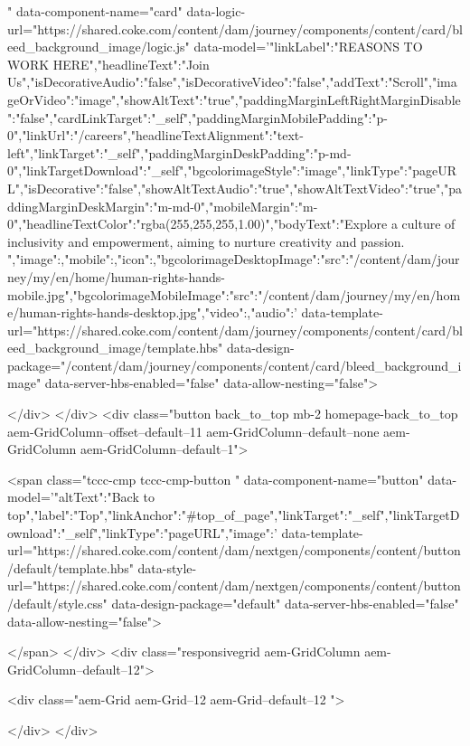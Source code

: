   " data-component-name="card" data-logic-url="https://shared.coke.com/content/dam/journey/components/content/card/bleed_background_image/logic.js" data-model='{"linkLabel":"REASONS TO WORK HERE","headlineText":"Join Us","isDecorativeAudio":"false","isDecorativeVideo":"false","addText":"Scroll","imageOrVideo":"image","showAltText":"true","paddingMarginLeftRightMarginDisable":"false","cardLinkTarget":"_self","paddingMarginMobilePadding":"p-0","linkUrl":"/careers","headlineTextAlignment":"text-left","linkTarget":"_self","paddingMarginDeskPadding":"p-md-0","linkTargetDownload":"_self","bgcolorimageStyle":"image","linkType":"pageURL","isDecorative":"false","showAltTextAudio":"true","showAltTextVideo":"true","paddingMarginDeskMargin":"m-md-0","mobileMargin":"m-0","headlineTextColor":"rgba(255,255,255,1.00)","bodyText":"Explore a culture of inclusivity and empowerment, aiming to nurture creativity and passion. ","image":{},"mobile":{},"icon":{},"bgcolorimageDesktopImage":{"src":"/content/dam/journey/my/en/home/human-rights-hands-mobile.jpg"},"bgcolorimageMobileImage":{"src":"/content/dam/journey/my/en/home/human-rights-hands-desktop.jpg"},"video":{},"audio":{}}' data-template-url="https://shared.coke.com/content/dam/journey/components/content/card/bleed_background_image/template.hbs" data-design-package="/content/dam/journey/components/content/card/bleed_background_image" data-server-hbs-enabled="false" data-allow-nesting="false">
  
  
</div>
</div>
<div class="button back_to_top mb-2 homepage-back_to_top aem-GridColumn--offset--default--11 aem-GridColumn--default--none aem-GridColumn aem-GridColumn--default--1">
    

<span class="tccc-cmp tccc-cmp-button " data-component-name="button" data-model='{"altText":"Back to top","label":"Top","linkAnchor":"#top_of_page","linkTarget":"_self","linkTargetDownload":"_self","linkType":"pageURL","image":{}}' data-template-url="https://shared.coke.com/content/dam/nextgen/components/content/button/default/template.hbs" data-style-url="https://shared.coke.com/content/dam/nextgen/components/content/button/default/style.css" data-design-package="default" data-server-hbs-enabled="false" data-allow-nesting="false">
  
  
</span>
</div>
<div class="responsivegrid aem-GridColumn aem-GridColumn--default--12">


<div class="aem-Grid aem-Grid--12 aem-Grid--default--12 ">
    
    
    
</div>
</div>

